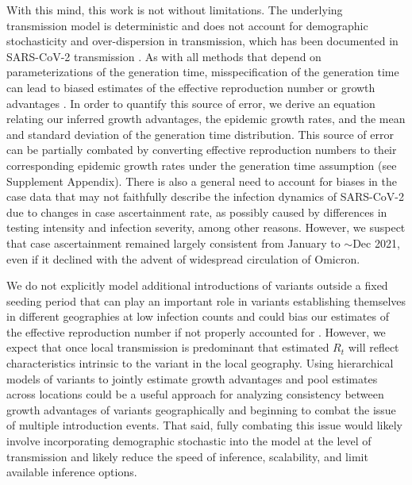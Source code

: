 With this mind, this work is not without limitations.
The underlying transmission model is deterministic and does not account for demographic stochasticity and over-dispersion in transmission, which has been documented in SARS-CoV-2 transmission \cite{Wong29416}.
As with all methods that depend on parameterizations of the generation time, misspecification of the generation time can lead to biased estimates of the effective reproduction number or growth advantages \cite{Gostic2020}.
In order to quantify this source of error, we derive an equation relating our inferred growth advantages, the epidemic growth rates, and the mean and standard deviation of the generation time distribution.
This source of error can be partially combated by converting effective reproduction numbers to their corresponding epidemic growth rates under the generation time assumption (see Supplement Appendix).
There is also a general need to account for biases in the case data that may not faithfully describe the infection dynamics of SARS-CoV-2 due to changes in case ascertainment rate, as possibly caused by differences in testing intensity and infection severity, among other reasons.
However, we suspect that case ascertainment remained largely consistent from January to $\sim$Dec 2021, even if it declined with the advent of widespread circulation of Omicron.


We do not explicitly model additional introductions of variants outside a fixed seeding period that can play an important role in variants establishing themselves in different geographies at low infection counts and could bias our estimates of the effective reproduction number if not properly accounted for \cite{Cori2013, MullerWagner2021}.
However, we expect that once local transmission is predominant that estimated $R_{t}$ will reflect characteristics intrinsic to the variant in the local geography.
Using hierarchical models of variants to jointly estimate growth advantages and pool estimates across locations could be a useful approach for analyzing consistency between growth advantages of variants geographically and beginning to combat the issue of multiple introduction events.
That said, fully combating this issue would likely involve incorporating demographic stochastic into the model at the level of transmission and likely reduce the speed of inference, scalability, and limit available inference options.

